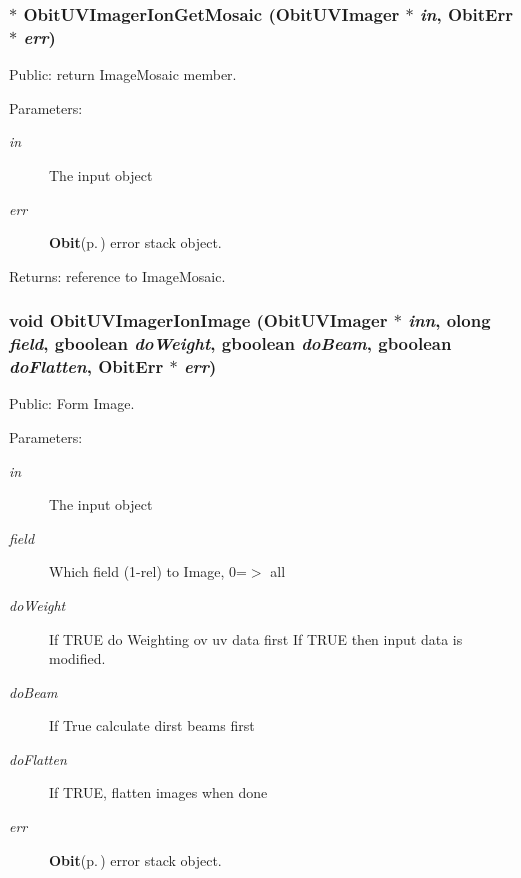 \subsubsection{$\ast$ Obit\-UVImager\-Ion\-Get\-Mosaic ({\bf Obit\-UVImager} $\ast$ {\em in}, {\bf Obit\-Err} $\ast$ {\em err})}\label{ObitUVImagerIon_8h_a14}


Public: return Image\-Mosaic member. 

\begin{Desc}
\item[Parameters:]
\begin{description}
\item[{\em in}]The input object \item[{\em err}]{\bf Obit}{\rm (p.\,\pageref{structObit})} error stack object. \end{description}
\end{Desc}
\begin{Desc}
\item[Returns:]reference to Image\-Mosaic. \end{Desc}
\subsubsection{\setlength{\rightskip}{0pt plus 5cm}void Obit\-UVImager\-Ion\-Image ({\bf Obit\-UVImager} $\ast$ {\em inn}, {\bf olong} {\em field}, gboolean {\em do\-Weight}, gboolean {\em do\-Beam}, gboolean {\em do\-Flatten}, {\bf Obit\-Err} $\ast$ {\em err})}\label{ObitUVImagerIon_8h_a12}


Public: Form Image. 

\begin{Desc}
\item[Parameters:]
\begin{description}
\item[{\em in}]The input object \item[{\em field}]Which field (1-rel) to Image, 0=$>$ all \item[{\em do\-Weight}]If TRUE do Weighting ov uv data first If TRUE then input data is modified. \item[{\em do\-Beam}]If True calculate dirst beams first \item[{\em do\-Flatten}]If TRUE, flatten images when done \item[{\em err}]{\bf Obit}{\rm (p.\,\pageref{structObit})} error stack object. \end{description}
\end{Desc}
